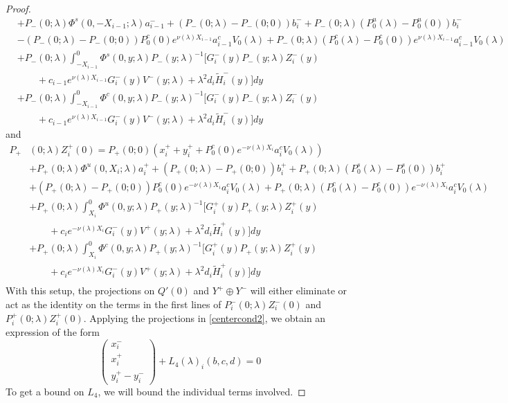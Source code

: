 \documentclass[thesis.tex]{subfiles}
\begin{document}
\begin{lemma}
\begin{proof}
\begin{align*}
&+ P_-(0; \lambda) \Phi^s(0, -X_{i-1}; \lambda) a_{i-1}^- + (P_-(0; \lambda) - P_-(0; 0))b_i^- + P_-(0; \lambda)(P_0^u(\lambda) - P_0^u(0))b_i^- \\
&- (P_-(0; \lambda) - P_-(0; 0)) P_0^c(0) e^{\nu(\lambda) X_{i-1}} a_{i-1}^c V_0(\lambda) + P_-(0; \lambda) (P_0^c(\lambda) - P_0^c(0)) e^{\nu(\lambda) X_{i-1}} a_{i-1}^c V_0(\lambda) \\
&+ P_-(0; \lambda) \int_{-X_{i-1}}^0 \Phi^s(0, y; \lambda) P_-(y; \lambda)^{-1} \big[ G_i^-(y) P_-(y; \lambda) Z_i^-(y) \\
&\qquad+ c_{i-1} e^{\nu(\lambda)X_{i-1}} G_i^-(y) V^-(y; \lambda) + \lambda^2 d_i \tilde{H}_i^-(y)\big] dy \\
&+ P_-(0; \lambda) \int_{-X_{i-1}}^0 \Phi^c(0, y; \lambda) P_-(y; \lambda)^{-1} \big[ G_i^-(y) P_-(y; \lambda) Z_i^-(y) \\
&\qquad+ c_{i-1} e^{\nu(\lambda)X_{i-1}} G_i^-(y) V^-(y; \lambda) + \lambda^2 d_i \tilde{H}_i^-(y)\big] dy 
\end{align*}
and
\begin{align*}
P_+&(0; \lambda) Z_i^+(0) = P_+(0; 0)( x_i^+ + y_i^+ + P_0^c(0) e^{-\nu(\lambda)X_i} a_i^c V_0(\lambda) )\\
&+ P_+(0; \lambda) \Phi^u(0, X_i; \lambda) a_i^+ + (P_+(0; \lambda) - P_+(0; 0)) b_i^+ + P_+(0; \lambda) (P_0^s(\lambda) - P_0^s(0)) b_i^+ \\
&+ (P_+(0; \lambda) - P_+(0; 0))P_0^c(0) e^{-\nu(\lambda)X_i} a_i^c V_0(\lambda) + P_+(0; \lambda) (P_0^c(\lambda) - P_0^c(0)) e^{-\nu(\lambda)X_i} a_i^c V_0(\lambda) \\
&+ P_+(0; \lambda) \int_{X_i}^0 \Phi^u(0, y; \lambda) P_+(y; \lambda)^{-1}\big[ G_i^+(y) P_+(y; \lambda) Z_i^+(y) \\
&\qquad+ c_i e^{-\nu(\lambda)X_i} G_i^-(y) V^+(y; \lambda) + \lambda^2 d_i \tilde{H}_i^+(y)\big] dy \\
&+ P_+(0; \lambda) \int_{X_i}^0 \Phi^c(0, y; \lambda) P_+(y; \lambda)^{-1}\big[ G_i^+(y) P_+(y; \lambda) Z_i^+(y) \\
&\qquad + c_i e^{-\nu(\lambda)X_i} G_i^-(y) V^+(y; \lambda) + \lambda^2 d_i \tilde{H}_i^+(y)\big] dy \\
\end{align*}
With this setup, the projections on $Q'(0)$ and $Y^+ \oplus Y^-$ will either eliminate or act as the identity on the terms in the first lines of $P_i^-(0; \lambda) Z_i^-(0)$ and $P_i^+(0; \lambda) Z_i^+(0)$. Applying the projections in \eqref{centercond2}, we obtain an expression of the form
\begin{equation}\label{projxy}
\begin{pmatrix}x_i^- \\ x_i^+ \\ 
y_i^+ - y_i^- \end{pmatrix} + L_4(\lambda)_i(b, c, d) = 0
\end{equation}
To get a bound on $L_4$, we will bound the individual terms involved. 


\end{proof}
\end{lemma}
\end{document}
